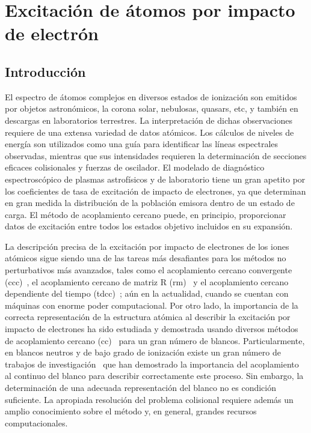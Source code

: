 \chapter{Excitación de átomos por impacto de electrón}
\label{chap:bayeopt}

\section{Introducción}
\label{sec:intro}

El espectro de átomos complejos en diversos estados de ionización son 
emitidos por objetos astronómicos, la corona solar, nebulosas, quasars, 
etc, y también en descargas en laboratorios terrestres. La interpretación
de dichas observaciones requiere de una extensa variedad de datos 
atómicos. Los cálculos de niveles de energía son utilizados como una guía
para identificar las líneas espectrales observadas, mientras que sus 
intensidades requieren la determinación de secciones eficaces 
colisionales y fuerzas de oscilador. 
El modelado de diagnóstico espectroscópico de plasmas astrofísicos y de 
laboratorio tiene un gran apetito por los coeficientes de tasa de 
excitación de impacto de electrones, ya que determinan en gran medida la 
distribución de la población emisora dentro de un estado de carga. El 
método de acoplamiento cercano puede, en principio, proporcionar datos 
de excitación entre todos los estados objetivo incluidos en su expansión.

La descripción precisa de la excitación por impacto de electrones de los 
iones atómicos sigue siendo una de las tareas más desafiantes para los 
métodos no perturbativos más avanzados, tales como el acoplamiento 
cercano convergente (\acs{ccc})~\cite{Bray:92}, el acoplamiento cercano 
de matriz R (\acs{rm})~\cite{Burke:75} y el acoplamiento cercano 
dependiente del tiempo (\acs{tdcc})~\cite{Pindzola:07}; aún en la 
actualidad, cuando se cuentan con máquinas con enorme poder computacional. 
Por otro lado, la importancia de la correcta representación de la 
estructura atómica al describir la excitación por impacto de electrones 
ha sido estudiada y demostrada usando diversos métodos de acoplamiento 
cercano (\acs{cc})~\cite{Bartschat:04,Zatsarinny:16,Be_Ballance:03} para 
un gran número de blancos. Particularmente, en blancos neutros y de bajo 
grado de ionización existe un gran número de trabajos de 
investigación~\cite{Ballance:03,Badnell:03,Mitnik:03} que han demostrado 
la importancia del acoplamiento al continuo del blanco para describir 
correctamente este proceso. Sin embargo, la determinación de una adecuada 
representación del blanco no es condición suficiente. La apropiada 
resolución del problema colisional requiere además un amplio conocimiento 
sobre el método y, en general, grandes recursos computacionales.

